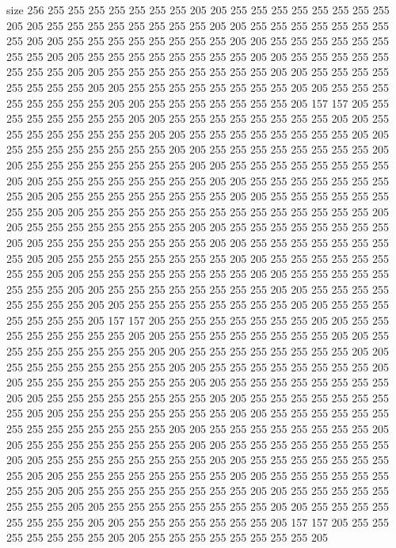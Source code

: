 size 256
255 255 255 255 255 255 255 205 205 255 255 255 255 255 255 255 255 205 205 255
255 255 255 255 255 255 255 205 205 255 255 255 255 255 255 255 255 205 205 255
255 255 255 255 255 255 255 205 205 255 255 255 255 255 255 255 255 205 205 255
255 255 255 255 255 255 255 205 205 255 255 255 255 255 255 255 255 205 205 255
255 255 255 255 255 255 255 205 205 255 255 255 255 255 255 255 255 205 205 255
255 255 255 255 255 255 255 205 205 255 255 255 255 255 255 255 255 205 205 255
255 255 255 255 255 255 205 157 157 205 255 255 255 255 255 255 255 205 205 255
255 255 255 255 255 255 255 205 205 255 255 255 255 255 255 255 255 205 205 255
255 255 255 255 255 255 255 205 205 255 255 255 255 255 255 255 255 205 205 255
255 255 255 255 255 255 255 205 205 255 255 255 255 255 255 255 255 205 205 255
255 255 255 255 255 255 255 205 205 255 255 255 255 255 255 255 255 205 205 255
255 255 255 255 255 255 255 205 205 255 255 255 255 255 255 255 255 205 205 255
255 255 255 255 255 255 255 205 205 255 255 255 255 255 255 255 255 255 255 255
255 255 255 205 205 255 255 255 255 255 255 255 255 205 205 255 255 255 255 255
255 255 255 205 205 255 255 255 255 255 255 255 255 205 205 255 255 255 255 255
255 255 255 205 205 255 255 255 255 255 255 255 255 205 205 255 255 255 255 255
255 255 255 205 205 255 255 255 255 255 255 255 255 205 205 255 255 255 255 255
255 255 255 205 205 255 255 255 255 255 255 255 255 205 205 255 255 255 255 255
255 255 255 205 205 255 255 255 255 255 255 255 255 205 205 255 255 255 255 255
255 255 205 157 157 205 255 255 255 255 255 255 255 205 205 255 255 255 255 255
255 255 255 205 205 255 255 255 255 255 255 255 255 205 205 255 255 255 255 255
255 255 255 205 205 255 255 255 255 255 255 255 255 205 205 255 255 255 255 255
255 255 255 205 205 255 255 255 255 255 255 255 255 205 205 255 255 255 255 255
255 255 255 205 205 255 255 255 255 255 255 255 255 205 205 255 255 255 255 255
255 255 255 205 205 255 255 255 255 255 255 255 255 205 205 255 255 255 255 255
255 255 255 205 205 255 255 255 255 255 255 255 255 255 255 255 255 255 255 205
205 255 255 255 255 255 255 255 255 205 205 255 255 255 255 255 255 255 255 205
205 255 255 255 255 255 255 255 255 205 205 255 255 255 255 255 255 255 255 205
205 255 255 255 255 255 255 255 255 205 205 255 255 255 255 255 255 255 255 205
205 255 255 255 255 255 255 255 255 205 205 255 255 255 255 255 255 255 255 205
205 255 255 255 255 255 255 255 255 205 205 255 255 255 255 255 255 255 255 205
205 255 255 255 255 255 255 255 255 205 205 255 255 255 255 255 255 255 205 157
157 205 255 255 255 255 255 255 255 205 205 255 255 255 255 255 255 255 255 205
